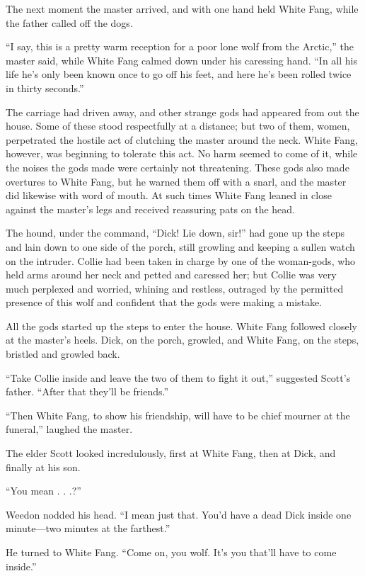 \documentclass[10pt]{book}
\begin{document}
The next moment the master arrived, and with one hand held White Fang,
while the father called off the dogs.

“I say, this is a pretty warm reception for a poor lone wolf from the
Arctic,” the master said, while White Fang calmed down under his
caressing hand. “In all his life he’s only been known once to go off
his feet, and here he’s been rolled twice in thirty seconds.”

The carriage had driven away, and other strange gods had appeared from
out the house. Some of these stood respectfully at a distance; but two
of them, women, perpetrated the hostile act of clutching the master
around the neck. White Fang, however, was beginning to tolerate this
act. No harm seemed to come of it, while the noises the gods made were
certainly not threatening. These gods also made overtures to White
Fang, but he warned them off with a snarl, and the master did likewise
with word of mouth. At such times White Fang leaned in close against
the master’s legs and received reassuring pats on the head.

The hound, under the command, “Dick! Lie down, sir!” had gone up the
steps and lain down to one side of the porch, still growling and
keeping a sullen watch on the intruder. Collie had been taken in charge
by one of the woman-gods, who held arms around her neck and petted and
caressed her; but Collie was very much perplexed and worried, whining
and restless, outraged by the permitted presence of this wolf and
confident that the gods were making a mistake.

All the gods started up the steps to enter the house. White Fang
followed closely at the master’s heels. Dick, on the porch, growled,
and White Fang, on the steps, bristled and growled back.

“Take Collie inside and leave the two of them to fight it out,”
suggested Scott’s father. “After that they’ll be friends.”

“Then White Fang, to show his friendship, will have to be chief mourner
at the funeral,” laughed the master.

The elder Scott looked incredulously, first at White Fang, then at
Dick, and finally at his son.

“You mean . . .?”

Weedon nodded his head. “I mean just that. You’d have a dead Dick
inside one minute—two minutes at the farthest.”

He turned to White Fang. “Come on, you wolf. It’s you that’ll have to
come inside.”
\end{document}
